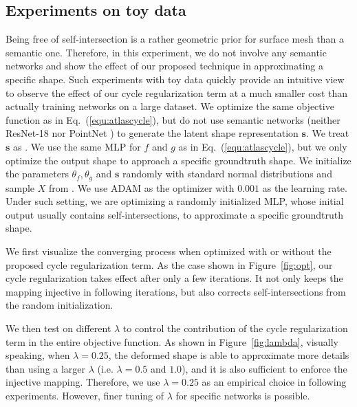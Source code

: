 \subsection{Experiments on toy data}
\label{subsec:deform}
 Being free of self-intersection is a rather geometric prior for surface mesh than a semantic one. Therefore, in this experiment, we do not involve any semantic networks and show the effect of our proposed technique in approximating a specific shape. Such experiments with toy data quickly provide an intuitive view to observe the effect of our cycle regularization term at a much smaller cost than actually training networks on a large dataset. We optimize the same objective function as in Eq.~(\ref{equ:atlascycle}), but do not use semantic networks (neither ResNet-18 \cite{resnet} nor PointNet \cite{pointnet}) to generate the latent shape representation $\mathbf{s}$. We treat $\mathbf{s}$ as . We use the same MLP for $f$ and $g$ as in Eq.~(\ref{equ:atlascycle}), but we only optimize the output shape to approach a specific groundtruth shape. We initialize the parameters $\theta_f,\theta_g$ and $\mathbf{s}$ randomly with standard normal distributions and sample $X$ from . We use ADAM \cite{adam} as the optimizer with $0.001$ as the learning rate.  Under such setting, we are optimizing a randomly initialized MLP, whose initial output usually contains self-intersections, to approximate a specific groundtruth shape. 
 
 We first visualize the converging process when optimized with or without the proposed cycle regularization term. As the case shown in Figure~\ref{fig:opt}, our cycle regularization takes effect after only a few iterations. It not only keeps the mapping injective in following iterations, but also corrects self-intersections from the random initialization.
 
We then test on different $\lambda$ to control the contribution of the cycle regularization term in the entire objective function. As shown in Figure~\ref{fig:lambda}, visually speaking, when $\lambda=0.25$, the deformed shape is able to approximate more details than using a larger $\lambda$ (i.e. $\lambda=0.5$ and $1.0$), and it is also sufficient to enforce the injective mapping.  Therefore, we use $\lambda=0.25$ as an empirical choice in following experiments. However, finer tuning of $\lambda$ for specific networks is possible.

